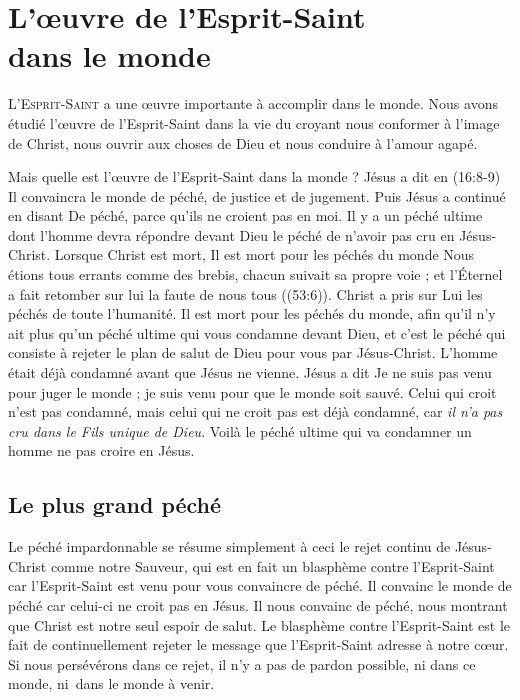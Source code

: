 \chapter[L'\oe{}uvre de l'Esprit-Saint dans le monde]{L'\oe{}uvre de l'Esprit-Saint\\ dans le monde}

\lettrine{L}{'Esprit-Saint} a une œuvre importante
 à accomplir dans le monde.
 Nous avons étudié l'œuvre de l'Esprit-Saint dans la vie du croyant\frcolon{}
 nous conformer à l'image de Christ, nous ouvrir aux choses de Dieu
 et nous conduire à l'amour agapé.

Mais quelle est l'œuvre de l'Esprit-Saint dans la monde ?
 Jésus a dit en (16:8-9)\frcolon{}
 \Og Il convaincra le monde de péché, de justice et de jugement. \Fg{}
 Puis Jésus a continué en disant\frcolon{}
 \Og De péché, parce qu'ils ne croient pas en moi. \Fg{}
 Il y a un péché ultime dont l'homme devra répondre devant Dieu
 \ocadr le péché de n'avoir pas cru en Jésus-Christ.
 Lorsque Christ est mort, Il est mort pour les péchés du monde\frcolon{}
 \Og Nous étions tous errants comme des brebis,
 chacun suivait sa propre voie ;
 et l'Éternel a fait retomber sur lui la faute de nous tous \Fg{}
 ((53:6)).
 Christ a pris sur Lui les péchés de toute l'humanité.
 Il est mort pour les péchés du monde, afin qu'il n'y ait plus qu'un péché
 ultime qui vous condamne devant Dieu, et c'est le péché qui consiste
 à rejeter le plan de salut de Dieu pour vous par Jésus-Christ.
 L'homme était déjà condamné avant que Jésus ne vienne.
 Jésus a dit\frcolon{} \Og Je ne suis pas venu pour juger le monde ;
 je suis venu pour que le monde soit sauvé.
 Celui qui croit n'est pas condamné, mais celui qui ne croit pas
 est déjà condamné, car \emph{il n'a pas cru dans le Fils
 unique de Dieu}. \Fg{}
 Voilà le péché ultime qui va condamner un homme
 \ocadr ne pas croire en Jésus.


\section{Le plus grand p\'ech\'e}


Le péché impardonnable se résume simplement à ceci\frcolon{}
 le rejet continu de Jésus-Christ comme notre Sauveur,
 qui est en fait un blasphème contre l'Esprit-Saint
 car l'Esprit-Saint est venu pour vous con\-vaincre de péché.
 Il \Og convainc le monde de péché \Fg{} car celui-ci
 ne croit pas en Jésus.
 Il nous convainc de péché, nous montrant que Christ
 est notre seul espoir de salut. Le blasphème contre l'Esprit-Saint
 est le fait de continuellement rejeter le message que l'Esprit-Saint adresse à notre cœur.
 Si nous persévérons dans ce rejet, il n'y a pas de pardon possible,
 ni dans ce monde, ni~dans le monde à venir. %

